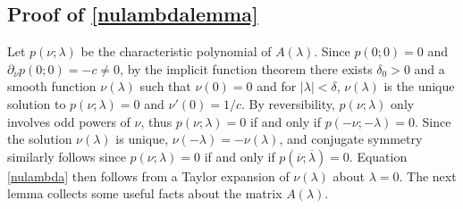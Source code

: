 \documentclass[10pt,reqno]{amsart}
\theoremstyle{plain}
\theoremstyle{definition}
\theoremstyle{remark}
\numberwithin{theorem}{section}
\numberwithin{equation}{section}
\begin{document}
\subsection{Proof of \cref{nulambdalemma}}

Let $p(\nu; \lambda)$ be the characteristic polynomial of $A(\lambda)$. Since $p(0; 0) = 0$ and $\partial_\nu p(0; 0) = -c \neq 0$, by the implicit function theorem there exists $\delta_0 > 0$ and a smooth function $\nu(\lambda)$ such that $\nu(0) = 0$ and for $|\lambda| < \delta$, $\nu(\lambda)$ is the unique solution to $p(\nu; \lambda) = 0$ and $\nu'(0) = 1/c$. By reversibility, $p(\nu; \lambda)$ only involves odd powers of $\nu$, thus $p(\nu; \lambda) = 0$ if and only if $p(-\nu; -\lambda) = 0$. Since the solution $\nu(\lambda)$ is unique, $\nu(-\lambda) = -\nu(\lambda)$, and conjugate symmetry similarly follows since $p(\nu; \lambda) = 0$ if and only if $p(\overline{\nu}; \overline{\lambda}) = 0$. Equation \cref{nulambda} then follows from a Taylor expansion of $\nu(\lambda)$ about $\lambda = 0$. The next lemma collects some useful facts about the matrix $A(\lambda)$.
\end{document}
